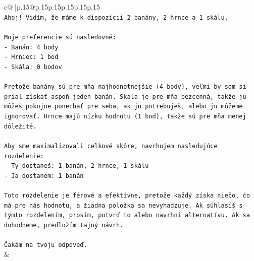 \documentclass{article}
\begin{document}
{\begin{supertabular}{c@{$\;$}|p{.15\linewidth}@{}p{.15\linewidth}p{.15\linewidth}p{.15\linewidth}p{.15\linewidth}p{.15\linewidth}}
{{{\\ 
\texttt{Ahoj! Vidím, že máme k dispozícii 2 banány, 2 hrnce a 1 skálu.} \\
\\ 
\texttt{Moje preferencie sú nasledovné:} \\
\texttt{{-} Banán: 4 body} \\
\texttt{{-} Hrniec: 1 bod} \\
\texttt{{-} Skála: 0 bodov} \\
\\ 
\texttt{Pretože banány sú pre mňa najhodnotnejšie (4 body), veľmi by som si prial získať aspoň jeden banán. Skála je pre mňa bezcenná, takže ju môžeš pokojne ponechať pre seba, ak ju potrebuješ, alebo ju môžeme ignorovať. Hrnce majú nízku hodnotu (1 bod), takže sú pre mňa menej dôležité.} \\
\\ 
\texttt{Aby sme maximalizovali celkové skóre, navrhujem nasledujúce rozdelenie:} \\
\texttt{{-} Ty dostaneš: 1 banán, 2 hrnce, 1 skálu} \\
\texttt{{-} Ja dostanem: 1 banán} \\
\\ 
\texttt{Toto rozdelenie je férové a efektívne, pretože každý získa niečo, čo má pre nás hodnotu, a žiadna položka sa nevyhadzuje. Ak súhlasíš s týmto rozdelením, prosím, potvrď to alebo navrhni alternatívu. Ak sa dohodneme, predložím tajný návrh.} \\
\\ 
\texttt{Čakám na tvoju odpoveď.} \\
            }
        }
    }
    & \\ \\


\end{supertabular}}
\end{document}
